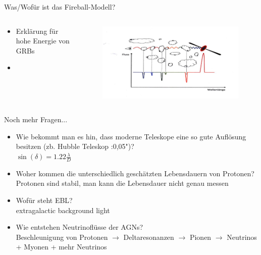  \begin{frame}{Was/Wofür ist das Fireball-Modell?}
    \begin{columns}
   \begin{column}{0.5\textwidth}
    \begin{itemize}
      \setlength\itemsep{2em}
      \item Erklärung für hohe Energie von GRBs
      \item
     \end{itemize}
  \vspace{2em}
  \end{column}
  \begin{column}{0.5\textwidth}
  \begin{figure}
    \centering
    \includegraphics[width=\textwidth]{images/lawald.png}
  \end{figure}
  \end{column}
    \end{columns}
  \end{frame}

  \begin{frame}{Noch mehr Fragen...}

    \begin{itemize}
      \setlength\itemsep{2em}
      \item Wie bekommt man es hin, dass moderne Teleskope eine so gute Auflösung
            besitzen (zb. Hubble Teleskop :0,05")?\\[1em]
            $\sin(\delta) = 1.22\frac{\lambda}{D}$
      \item Woher kommen die unterschiedlich geschätzten Lebensdauern von Protonen?\\[1em]
            Protonen sind stabil, man kann die Lebensdauer nicht genau messen
      \item Wofür steht EBL?\\[1em]
            extragalactic background light
      \item Wie entstehen Neutrinoflüsse der AGNs?\\[1em]
            Beschleunigung von Protonen $\rightarrow$ Deltaresonanzen $\rightarrow$ Pionen $\rightarrow$ Neutrinos + Myonen + mehr Neutrinos
     \end{itemize}
  \end{frame}

